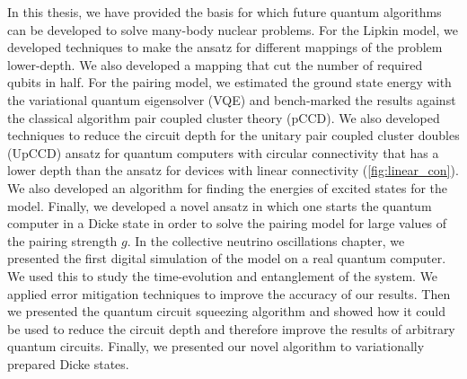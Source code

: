 \documentclass[10pt]{article}
\begin{document}
In this thesis, we have provided the basis for which future quantum algorithms can be developed to solve many-body nuclear problems. For the Lipkin model, we developed techniques to make the ansatz for different mappings of the problem lower-depth. We also developed a mapping that cut the number of required qubits in half. For the pairing model, we estimated the ground state energy with the variational quantum eigensolver (VQE) and bench-marked the results against the classical algorithm pair coupled cluster theory (pCCD). We also developed techniques to reduce the circuit depth for the unitary pair coupled cluster doubles (UpCCD) ansatz for quantum computers with circular connectivity that has a lower depth than the ansatz for devices with linear connectivity (\ref{fig:linear_con}). We also developed an algorithm for finding the energies of excited states for the model. Finally, we developed a novel ansatz in which one starts the quantum computer in a Dicke state in order to solve the pairing model for large values of the pairing strength $g$. In the collective neutrino oscillations chapter, we presented the first digital simulation of the model on a real quantum computer. We used this to study the time-evolution and entanglement of the system. We applied error mitigation techniques to improve the accuracy of our results. Then we presented the quantum circuit squeezing algorithm and showed how it could be used to reduce the circuit depth and therefore improve the results of arbitrary quantum circuits. Finally, we presented our novel algorithm to variationally prepared Dicke states.
\end{document}
